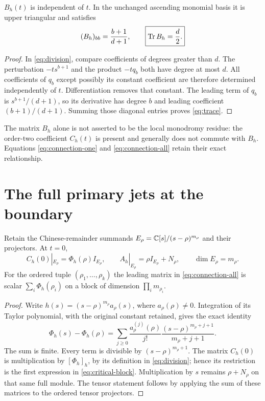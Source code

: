 \begin{proposition}
$B_h(t)$ is independent of $t$.  In the unchanged ascending monomial
basis it is upper triangular and satisfies
\begin{equation}
 (B_h)_{bb}=\frac{b+1}{d+1},\qquad
 \boxed{\operatorname{Tr} B_h=\frac d2.}
 \label{eq:trace}
\end{equation}
\end{proposition}
\begin{proof}
In \eqref{eq:division}, compare coefficients of degrees greater than
$d$.  The perturbation $-ts^{b+1}$ and the product $-tq_b$ both have
degree at most $d$.  All coefficients of $q_b$ except possibly its
constant coefficient are therefore determined independently of $t$.
Differentiation removes that constant.  The leading term of $q_b$ is
$s^{b+1}/(d+1)$, so its derivative has degree $b$ and leading coefficient
$(b+1)/(d+1)$.  Summing those diagonal entries proves
\eqref{eq:trace}.
\end{proof}

The matrix $B_h$ alone is not asserted to be the local monodromy
residue: the order-two coefficient $C_h(t)$ is present and generally
does not commute with $B_h$.  Equations \eqref{eq:connection-one} and
\eqref{eq:connection-all} retain their exact relationship.

\section{The full primary jets at the boundary}

\begin{proposition}
Retain the Chinese-remainder summands
$E_\rho=\mathbb C[s]/(s-\rho)^{m_\rho}$ and their projectors.  At $t=0$,
\begin{equation}
 C_h(0)|_{E_\rho}=\Phi_h(\rho)I_{E_\rho},\qquad
 A_h|_{E_\rho}=\rho I_{E_\rho}+N_\rho,\qquad
 \dim E_\rho=m_\rho.
 \label{eq:critical-block}
\end{equation}
For the ordered tuple $(\rho_1,\ldots,\rho_k)$ the leading matrix in
\eqref{eq:connection-all} is scalar
$\sum_i\Phi_h(\rho_i)$ on a block of dimension
$\prod_i m_{\rho_i}$.
\end{proposition}
\begin{proof}
Write $h(s)=(s-\rho)^{m_\rho}a_\rho(s)$, where
$a_\rho(\rho)\ne0$.  Integration of its Taylor polynomial, with the
original constant retained, gives the exact identity
\begin{equation}
 \Phi_h(s)-\Phi_h(\rho)=
 \sum_{j\ge0}\frac{a_\rho^{(j)}(\rho)}{j!}
       \frac{(s-\rho)^{m_\rho+j+1}}{m_\rho+j+1}.
 \label{eq:full-taylor}
\end{equation}
The sum is finite.  Every term is divisible by
$(s-\rho)^{m_\rho+1}$.  The matrix $C_h(0)$ is multiplication by
$[\Phi_h]_h$, by its definition in \eqref{eq:division}; hence its
restriction is the first expression in \eqref{eq:critical-block}.
Multiplication by $s$ remains $\rho+N_\rho$ on that same full module.
The tensor statement follows by applying the sum of these matrices
to the ordered tensor projectors.
\end{proof}

